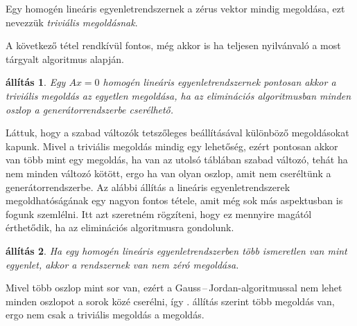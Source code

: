 \documentclass[a4paper, showtrims]{memoir}
\makeatletter
\renewenvironment{proof}[1][\proofname]
    {\par\pushQED{\qed}%
    \normalfont \topsep6\p@\@plus6\p@\relax
    \trivlist
    \item[\hskip\labelsep
        \itshape
    #1\@addpunct{:}]\ignorespaces}
    {\popQED\endtrivlist\@endpefalse}
\theoremstyle{plain}
\newtheorem{proposition}{állítás}[chapter]
\theoremstyle{remark}
\theoremstyle{definition}
\makeatother
\begin{document}
Egy homogén lineáris egyenletrendszernek a zérus vektor mindig megoldása,
ezt nevezzük \emph{triviális megoldásnak}.

A következő tétel rendkívül fontos, még akkor is ha teljesen nyilvánvaló a most tárgyalt algoritmus alapján.
\begin{proposition}\label{pr:hom-inj}
	Egy $Ax=0$ homogén lineáris egyenletrendszernek pontosan akkor a triviális megoldás az egyetlen megoldása,
	ha az eliminációs algoritmusban minden oszlop a generátorrendszerbe cserélhető.
\end{proposition}
\begin{proof}
    Láttuk, hogy a szabad változók tetszőleges beállításával különböző megoldásokat kapunk.
    Mivel a triviális megoldás mindig egy lehetőség, 
    ezért pontosan akkor van több mint egy megoldás, ha van az utolsó táblában szabad változó,
    tehát ha nem minden változó kötött, ergo ha van olyan oszlop, amit nem cseréltünk a generátorrendszerbe.
\end{proof}
Az alábbi állítás a lineáris egyenletrendszerek megoldhatóságának egy nagyon fontos tétele,
amit még sok más aspektusban is fogunk szemlélni. 
Itt azt szeretném rögzíteni, hogy ez mennyire magától érthetődik,
ha az eliminációs algoritmusra gondolunk.
\begin{proposition}
	Ha egy homogén lineáris egyenletrendszerben több ismeretlen van mint egyenlet,
	akkor a rendszernek van nem zéró megoldása.
\end{proposition}
\begin{proof}
    Mivel több oszlop mint sor van, 
    ezért a Gauss\,--\,Jordan-algoritmussal nem lehet minden oszlopot
    a sorok közé cserélni, 
    így . állítás szerint több megoldás van, 
    ergo nem csak a triviális megoldás a megoldás.
\end{proof}
\end{document}
